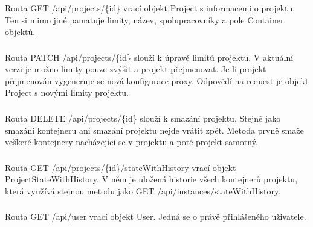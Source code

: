 \documentclass[a4paper,oneside,12pt]{report}
\begin{document}
\subsubsection{}

Routa GET /api/projects/\{id\} vrací objekt Project s informacemi o projektu.
Ten si mimo jiné pamatuje limity, název, spolupracovníky a pole Container objektů.

\subsubsection{}

Routa PATCH /api/projects/\{id\} slouží k úpravě limitů projektu.
V aktuální verzi je možno limity pouze zvýšit a projekt přejmenovat.
Je li projekt přejmenován vygeneruje se nová konfigurace proxy.
Odpovědí na request je objekt Project s novými limity projektu.

\subsubsection{}

Routa DELETE /api/projects/\{id\} slouží k smazání projektu.
Stejně jako  smazání kontejneru ani smazání projektu nejde vrátit zpět.
Metoda prvně smaže veškeré kontejnery nacházející se v projektu a poté projekt samotný.

\subsubsection{}

Routa GET /api/projects/\{id\}/stateWithHistory vrací objekt ProjectStateWithHistory.
V něm je uložená historie všech kontejnerů projektu, která využívá stejnou metodu jako GET /api/instances/stateWithHistory.

\subsubsection{\color{apiblue}{GET -- /api/user}}

Routa GET /api/user vrací objekt User.
Jedná se o právě přihlášeného uživatele.

\subsubsection{\color{apiblue}{GET -- /api/logout}}
\end{document}
